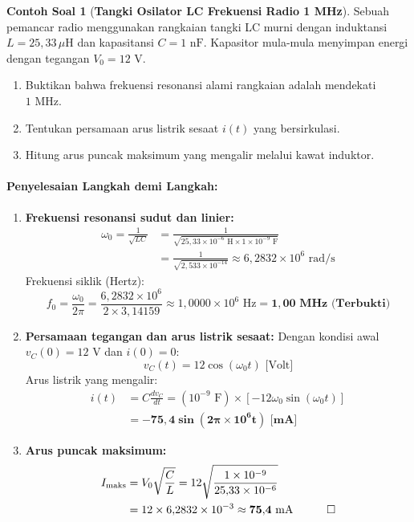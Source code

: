 \documentclass[11pt,a4paper]{article}
\theoremstyle{definition}
\newtheorem{example}{Contoh Soal}[section]
\begin{document}
\begin{example}[\textbf{Tangki Osilator LC Frekuensi Radio 1 MHz}]
Sebuah pemancar radio menggunakan rangkaian tangki LC murni dengan induktansi $L = 25{,}33\,\mu\text{H}$ dan kapasitansi $C = 1\text{ nF}$. Kapasitor mula-mula menyimpan energi dengan tegangan $V_0 = 12\text{ V}$.
\begin{enumerate}[label=(\alph*)]
    \item Buktikan bahwa frekuensi resonansi alami rangkaian adalah mendekati $1\text{ MHz}$.
    \item Tentukan persamaan arus listrik sesaat $i(t)$ yang bersirkulasi.
    \item Hitung arus puncak maksimum yang mengalir melalui kawat induktor.
\end{enumerate}

\paragraph{Penyelesaian Langkah demi Langkah:}
\begin{enumerate}[label=(\alph*), leftmargin=*]
    \item \textbf{Frekuensi resonansi sudut dan linier:}
    \begin{align*}
        \omega_0 = \frac{1}{\sqrt{L C}} &= \frac{1}{\sqrt{25{,}33 \times 10^{-6}\text{ H} \times 1 \times 10^{-9}\text{ F}}} \\
        &= \frac{1}{\sqrt{2{,}533 \times 10^{-14}}} \approx 6{,}2832 \times 10^6\text{ rad/s}
    \end{align*}
    Frekuensi siklik (Hertz):
    \begin{equation*}
        f_0 = \frac{\omega_0}{2\pi} = \frac{6{,}2832 \times 10^6}{2 \times 3{,}14159} \approx 1{,}0000 \times 10^6\text{ Hz} = \mathbf{1{,}00\text{ MHz (Terbukti)}}
    \end{equation*}

    \item \textbf{Persamaan tegangan dan arus listrik sesaat:}
    Dengan kondisi awal $v_C(0) = 12\text{ V}$ dan $i(0) = 0$:
    \begin{equation*}
        v_C(t) = 12 \cos(\omega_0 t)\text{ [Volt]}
    \end{equation*}
    Arus listrik yang mengalir:
    \begin{align*}
        i(t) &= C \frac{dv_C}{dt} = (10^{-9}\text{ F}) \times \left[ -12 \omega_0 \sin(\omega_0 t) \right] \\
        &= \mathbf{-75{,}4 \sin(2\pi \times 10^6 t)\text{ [mA]}}
    \end{align*}

    \item \textbf{Arus puncak maksimum:}
    \begin{align*}
        I_{\text{maks}} &= V_0 \sqrt{\frac{C}{L}} = 12 \sqrt{\frac{1 \times 10^{-9}}{25{,}33 \times 10^{-6}}} \\
        &= 12 \times 6{,}2832 \times 10^{-3} \approx \mathbf{75{,}4\text{ mA}} \quad \qed
    \end{align*}
\end{enumerate}
\end{example}
\end{document}

